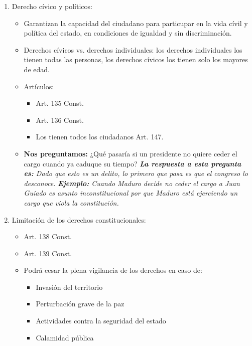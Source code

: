\begin{enumerate}
    \item Derecho cívico y políticos: 
        \begin{itemize}
            \item Garantizan la capacidad del ciudadano para particupar en la vida cívil y política del estado, en condiciones de igualdad y sin discriminación.
            \item Derechos cívicos vs. derechos individuales:  los derechos individuales los tienen todas las personas, los derechos cívicos los tienen solo los mayores de edad.
            \item Artículos: 
                \begin{itemize}
                    \item Art. 135 Const. 
                    \item Art. 136 Const.
                    \item Los tienen todos los ciudadanos Art. 147.
                \end{itemize}
            \item \textbf{Nos preguntamos:} ¿Qué pasaría si un presidente no quiere ceder el cargo cuando ya caduque su tiempo? \emph{\textbf{La respuesta a esta pregunta es: }Dado que esto es un delito, lo primero que pasa es que el congreso lo desconoce.} \emph{\textbf{Ejemplo: }Cuando Maduro decide no ceder el cargo a Juan Guiado es asunto inconstitucional por que Maduro está ejerciendo un cargo que viola la constitución.}
        \end{itemize}
    
    \item Limitación de los derechos constitucionales:
        \begin{itemize}
            \item Art. 138 Const.
            \item Art. 139 Const.
            \item Podrá cesar la plena vigilancia de los derechos en caso de:
                \begin{itemize}
                    \item Invasión del territorio
                    \item Perturbación grave de la paz
                    \item Actividades contra la seguridad del estado
                    \item Calamidad pública 
                \end{itemize}
                

\end{itemize}
\end{enumerate}
